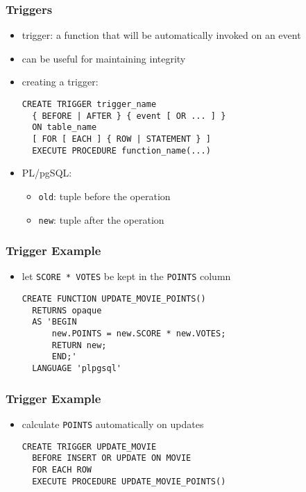 \documentclass[dvipsnames]{beamer}
\theoremstyle{plain}
\begin{document}
\begin{frame}[fragile]
  \frametitle{Triggers}

  \begin{itemize}
    \item \alert{trigger}: a function that will be automatically invoked
      on an event
    \item can be useful for maintaining integrity

    \pause
    \medskip
    \item creating a trigger:
    \smallskip
    \begin{lstlisting}
CREATE TRIGGER trigger_name
  { BEFORE | AFTER } { event [ OR ... ] }
  ON table_name
  [ FOR [ EACH ] { ROW | STATEMENT } ]
  EXECUTE PROCEDURE function_name(...)
    \end{lstlisting}

    \item PL/pgSQL:
    \begin{itemize}
      \item \lstinline!old!: tuple before the operation
      \item \lstinline!new!: tuple after the operation
    \end{itemize}
  \end{itemize}
\end{frame}

\begin{frame}[fragile]
  \frametitle{Trigger Example}

  \begin{itemize}
    \item let \lstinline!SCORE * VOTES! be kept in the \lstinline!POINTS! column

    \medskip
    \begin{lstlisting}
CREATE FUNCTION UPDATE_MOVIE_POINTS()
  RETURNS opaque
  AS 'BEGIN
      new.POINTS = new.SCORE * new.VOTES;
      RETURN new;
      END;'
  LANGUAGE 'plpgsql'
    \end{lstlisting}
  \end{itemize}
\end{frame}

\begin{frame}[fragile]
  \frametitle{Trigger Example}

  \begin{itemize}
    \item calculate \lstinline!POINTS! automatically on updates

    \medskip
    \begin{lstlisting}
CREATE TRIGGER UPDATE_MOVIE
  BEFORE INSERT OR UPDATE ON MOVIE
  FOR EACH ROW
  EXECUTE PROCEDURE UPDATE_MOVIE_POINTS()
    \end{lstlisting}
  \end{itemize}
\end{frame}
\end{document}
